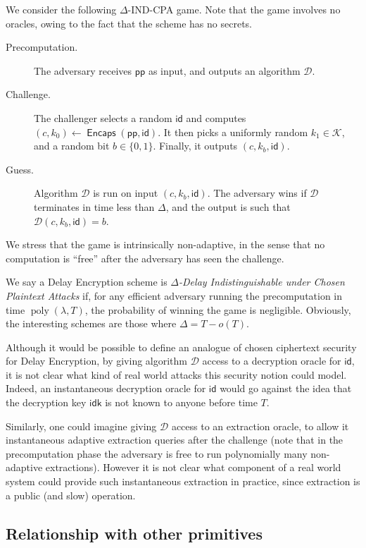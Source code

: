\documentclass{llncs}
\DeclareMathOperator{\poly}{poly}
\DeclareMathOperator{\Encaps}{\mathsf{Encaps}}
\newcommand{\pp}{\mathsf{pp}}
\newcommand{\id}{\mathsf{id}}
\newcommand{\idk}{\mathsf{idk}}
\newcommand{\keyspace}{\mathcal{K}}
\begin{document}
We consider the following $\Delta$-IND-CPA game. %
Note that the game involves no oracles, owing to the fact that the
scheme has no secrets. %
%
\begin{description}
\item[Precomputation.] The adversary receives $\pp$ as input, and
  outputs an algorithm $\mathcal{D}$. %
\item[Challenge.] The challenger selects a random $\id$ and computes
  $(c,k_0)\gets\Encaps(\pp,\id)$. %
  It then picks a uniformly random $k_1\in\keyspace$, and a random bit
  $b\in\{0,1\}$. %
  Finally, it outputs $(c,k_b,\id)$.
\item[Guess.]  Algorithm $\mathcal{D}$ is run on input
  $(c,k_b,\id)$. %
  The adversary wins if $\mathcal{D}$ terminates in time less than
  $\Delta$, and the output is such that $\mathcal{D}(c,k_b,\id) = b$.
\end{description}

We stress that the game is intrinsically non-adaptive, in the sense
that no computation is ``free'' after the adversary has seen the
challenge.

We say a Delay Encryption scheme is \emph{$\Delta$-Delay
  Indistinguishable under Chosen Plaintext Attacks} if, for any
efficient adversary running the precomputation in time
$\poly(\lambda,T)$, the probability of winning the game is
negligible. %
Obviously, the interesting schemes are those where $\Delta = T-o(T)$.

\begin{remark}
  Although it would be possible to define an analogue of chosen
  ciphertext security for Delay Encryption, by giving algorithm
  $\mathcal{D}$ access to a decryption oracle for $\id$, it is not
  clear what kind of real world attacks this security notion could
  model. Indeed, an instantaneous decryption oracle for $\id$ would go
  against the idea that the decryption key $\idk$ is not known to
  anyone before time $T$.

  Similarly, one could imagine giving $\mathcal{D}$ access to an
  extraction oracle, to allow it instantaneous adaptive extraction
  queries after the challenge (note that in the precomputation phase
  the adversary is free to run polynomially many non-adaptive
  extractions). However it is not clear what component of a real world
  system could provide such instantaneous extraction in practice,
  since extraction is a public (and slow) operation.
\end{remark}


\subsection{Relationship with other primitives}
\end{document}
